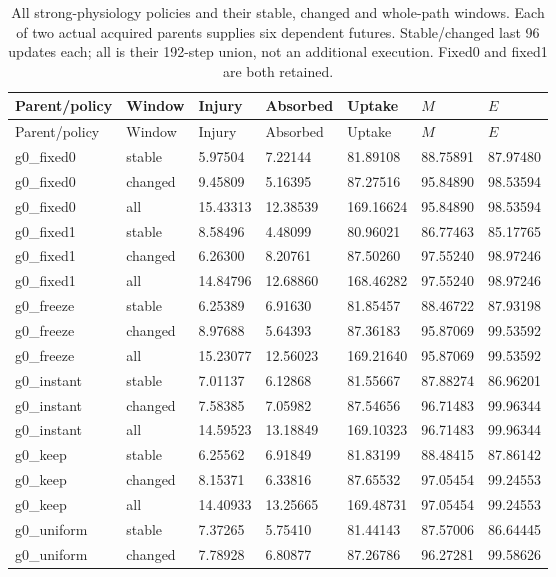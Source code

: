 \begin{longtable}{lllllll}
\caption{All strong-physiology policies and their stable, changed and whole-path windows. Each of two actual acquired parents supplies six dependent futures. Stable/changed last 96 updates each; all is their 192-step union, not an additional execution. Fixed0 and fixed1 are both retained.}\label{tab:maintenance-strong}\\
\toprule
Parent/policy & Window & Injury & Absorbed & Uptake & $M$ & $E$ \\
\midrule
\endfirsthead
\toprule
Parent/policy & Window & Injury & Absorbed & Uptake & $M$ & $E$ \\
\midrule
\endhead
g0\_fixed0 & stable & 5.97504 & 7.22144 & 81.89108 & 88.75891 & 87.97480 \\
g0\_fixed0 & changed & 9.45809 & 5.16395 & 87.27516 & 95.84890 & 98.53594 \\
g0\_fixed0 & all & 15.43313 & 12.38539 & 169.16624 & 95.84890 & 98.53594 \\
g0\_fixed1 & stable & 8.58496 & 4.48099 & 80.96021 & 86.77463 & 85.17765 \\
g0\_fixed1 & changed & 6.26300 & 8.20761 & 87.50260 & 97.55240 & 98.97246 \\
g0\_fixed1 & all & 14.84796 & 12.68860 & 168.46282 & 97.55240 & 98.97246 \\
g0\_freeze & stable & 6.25389 & 6.91630 & 81.85457 & 88.46722 & 87.93198 \\
g0\_freeze & changed & 8.97688 & 5.64393 & 87.36183 & 95.87069 & 99.53592 \\
g0\_freeze & all & 15.23077 & 12.56023 & 169.21640 & 95.87069 & 99.53592 \\
g0\_instant & stable & 7.01137 & 6.12868 & 81.55667 & 87.88274 & 86.96201 \\
g0\_instant & changed & 7.58385 & 7.05982 & 87.54656 & 96.71483 & 99.96344 \\
g0\_instant & all & 14.59523 & 13.18849 & 169.10323 & 96.71483 & 99.96344 \\
g0\_keep & stable & 6.25562 & 6.91849 & 81.83199 & 88.48415 & 87.86142 \\
g0\_keep & changed & 8.15371 & 6.33816 & 87.65532 & 97.05454 & 99.24553 \\
g0\_keep & all & 14.40933 & 13.25665 & 169.48731 & 97.05454 & 99.24553 \\
g0\_uniform & stable & 7.37265 & 5.75410 & 81.44143 & 87.57006 & 86.64445 \\
g0\_uniform & changed & 7.78928 & 6.80877 & 87.26786 & 96.27281 & 99.58626 \\

\end{longtable}
